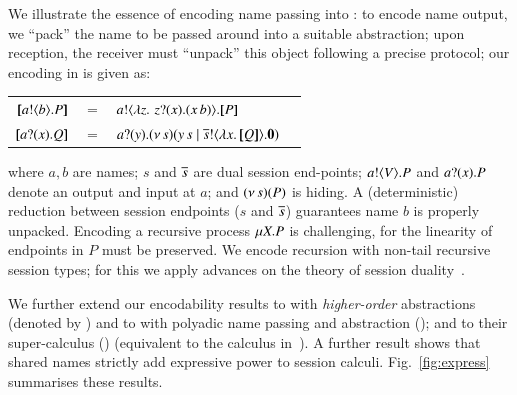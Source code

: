 We illustrate the essence of encoding name passing into \HO: 
to encode name output, we ``pack''
the name to be passed around into a suitable abstraction; 
upon reception, the receiver must ``unpack'' this object following a precise protocol; our encoding 
in \HO is given as:
\begin{center}
\begin{tabular}{rcll}
  $[\!\![a ! \langle b \rangle . P]\!\!]$	&$=$&	$a ! \langle  \lambda z.\,\,z ? (x) . (x\, {b})  \rangle . [\!\![P]\!\!]$ \\
  $[\!\![a ? (x) . Q]\!\!]$	&$=$&	$a ? (y) . (\nu\, s)(y\, {s} \;|\; \overline{s} ! \langle \lambda x.\,[\!\![Q]\!\!] \rangle . \mathbf{0})$
\end{tabular}
\end{center}
\noi where $a,b$ are names; $s$ and $\overline{s}$ are 
dual session end-points;
$a ! \langle V \rangle . P$ and 
$a ? (x) . P$ denote an output and input at $a$;   
and $(\nu\, s)(P)$ is hiding. 
A (deterministic) reduction between session endpoints 
($s$ and $\overline{s}$) guarantees name $b$ is properly unpacked.
Encoding a recursive process $\mu X. P$ is  challenging, for 
the linearity of endpoints in $P$ must be preserved.
We encode recursion with non-tail recursive session types; for this 
we apply advances on the theory of session duality~\cite{TGC14,DBLP:journals/corr/abs-1202-2086}.

We further extend our encodability results to 
\HOp with \emph{higher-order} abstractions (denoted by \HOpp) 
and to \HOp with polyadic name passing and abstraction (\pHOp); and to
their super-calculus  (\PHOpp) (equivalent to the calculus in~\cite{tlca07}). 
A further result shows that 
shared names
strictly add expressive power 
to session calculi. 
Fig.~\ref{fig:express} summarises %
these results. %

